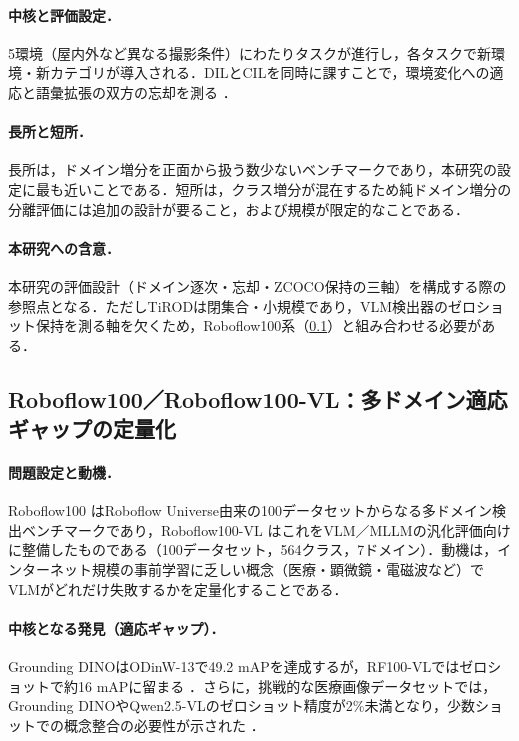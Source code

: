 \paragraph{中核と評価設定．}
5環境（屋内外など異なる撮影条件）にわたりタスクが進行し，各タスクで新環境・新カテゴリが導入される．DILとCILを同時に課すことで，環境変化への適応と語彙拡張の双方の忘却を測る \cite{tirod}．

\paragraph{長所と短所．}
長所は，ドメイン増分を正面から扱う数少ないベンチマークであり，本研究の設定に最も近いことである．短所は，クラス増分が混在するため純ドメイン増分の分離評価には追加の設計が要ること，および規模が限定的なことである．

\paragraph{本研究への含意．}
本研究の評価設計（ドメイン逐次・忘却・ZCOCO保持の三軸）を構成する際の参照点となる．ただしTiRODは閉集合・小規模であり，VLM検出器のゼロショット保持を測る軸を欠くため，Roboflow100系（\ref{subsec:rf100}）と組み合わせる必要がある．


\subsection{Roboflow100／Roboflow100-VL：多ドメイン適応ギャップの定量化}
\label{subsec:rf100}

\paragraph{問題設定と動機．}
Roboflow100 \cite{rf100} はRoboflow Universe由来の100データセットからなる多ドメイン検出ベンチマークであり，Roboflow100-VL \cite{rf100vl} はこれをVLM／MLLMの汎化評価向けに整備したものである（100データセット，564クラス，7ドメイン）．動機は，インターネット規模の事前学習に乏しい概念（医療・顕微鏡・電磁波など）でVLMがどれだけ失敗するかを定量化することである．

\paragraph{中核となる発見（適応ギャップ）．}
Grounding DINOはODinW-13で49.2 mAPを達成するが，RF100-VLではゼロショットで約16 mAPに留まる \cite{rf100vl}．さらに，挑戦的な医療画像データセットでは，Grounding DINOやQwen2.5-VLのゼロショット精度が2\%未満となり，少数ショットでの概念整合の必要性が示された \cite{rf100vl}．

